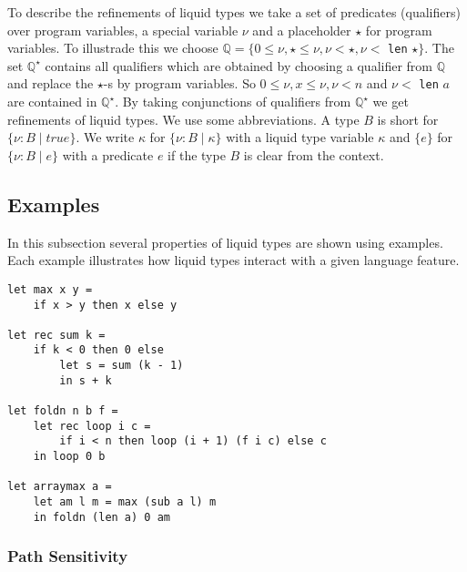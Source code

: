 \documentclass[a4paper,UKenglish]{lipics-v2016}
\begin{document}
To describe the refinements of liquid types we take a set of predicates (qualifiers) over program variables, a special variable $\nu$ and a placeholder $\star$ for program variables.
To illustrade this we choose $\mathbb{Q} = \{ 0 \le \nu, \star \le \nu, \nu < \star, \nu <$ \lstinline{len} $\star\}$.
The set $\mathbb{Q}^\star$ contains all qualifiers which are obtained by choosing a qualifier from $\mathbb{Q}$ and replace the $\star$-s by program variables.
So $0 \le \nu, x \le \nu, \nu < n$ and $\nu <$ \lstinline{len} $a$ are contained in $\mathbb{Q}^\star$.
By taking conjunctions of qualifiers from $\mathbb{Q}^\star$ we get refinements of liquid types.
We use some abbreviations.
A type $B$ is short for $\{\nu: B \mid true\}$.
We write $\kappa$ for $\{\nu: B \mid \kappa\}$ with a liquid type variable $\kappa$ and $\{e\}$ for $\{\nu: B \mid e\}$ with a predicate $e$ if the type $B$ is clear from the context.

\subsection{Examples}
\label{subsec:exmpl}

In this subsection several properties of liquid types are shown using examples.
Each example illustrates how liquid types interact with a given language feature.

\begin{lstlisting}[caption={Example Program},label=lst:exmpl,captionpos=t,float,abovecaptionskip=-\medskipamount]
let max x y =
    if x > y then x else y

let rec sum k =
    if k < 0 then 0 else
        let s = sum (k - 1)
        in s + k

let foldn n b f =
    let rec loop i c =
        if i < n then loop (i + 1) (f i c) else c
    in loop 0 b

let arraymax a =
    let am l m = max (sub a l) m
    in foldn (len a) 0 am
\end{lstlisting}

\subsubsection{Path Sensitivity}
\end{document}
